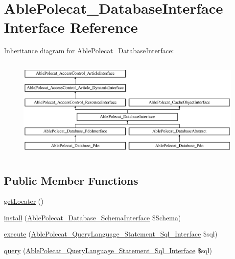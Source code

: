 \hypertarget{interface_able_polecat___database_interface}{}\section{Able\+Polecat\+\_\+\+Database\+Interface Interface Reference}
\label{interface_able_polecat___database_interface}
Inheritance diagram for Able\+Polecat\+\_\+\+Database\+Interface\+:\begin{figure}[H]
\begin{center}
\leavevmode
\includegraphics[height=5.121951cm]{interface_able_polecat___database_interface}
\end{center}
\end{figure}
\subsection*{Public Member Functions}
\begin{DoxyCompactItemize}
\item 
\hyperlink{interface_able_polecat___database_interface_a66e49cc03d1511ec4c0290ffaa688079}{get\+Locater} ()
\item 
\hyperlink{interface_able_polecat___database_interface_aba618d13fc7fc2ddca23db57614cd14d}{install} (\hyperlink{interface_able_polecat___database___schema_interface}{Able\+Polecat\+\_\+\+Database\+\_\+\+Schema\+Interface} \$Schema)
\item 
\hyperlink{interface_able_polecat___database_interface_a2446b764608f23c472255a8e07076aff}{execute} (\hyperlink{interface_able_polecat___query_language___statement___sql___interface}{Able\+Polecat\+\_\+\+Query\+Language\+\_\+\+Statement\+\_\+\+Sql\+\_\+\+Interface} \$sql)
\item 
\hyperlink{interface_able_polecat___database_interface_a036b9fde55003e5c63dd6345b0f2a805}{query} (\hyperlink{interface_able_polecat___query_language___statement___sql___interface}{Able\+Polecat\+\_\+\+Query\+Language\+\_\+\+Statement\+\_\+\+Sql\+\_\+\+Interface} \$sql)
\end{DoxyCompactItemize}
